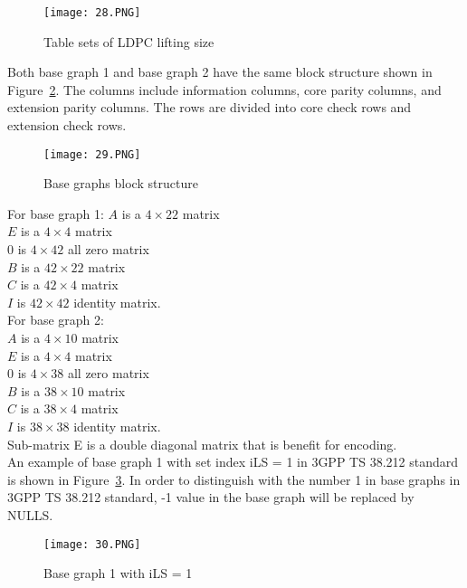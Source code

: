 \begin{figure}[h]
\centering
\label{fig:ldpc lifting sizes}
\texttt{[image: 28.PNG]}
\caption{Table sets of LDPC lifting size}
\end{figure}

Both base graph 1 and base graph 2 have the same block structure shown in Figure~\ref{fig:block structure}. The columns include information columns, core parity columns, and extension parity columns. The rows are divided into core check rows and extension check rows.

\begin{figure}[h]
\centering
\texttt{[image: 29.PNG]}
\caption{Base graphs block structure}
\label{fig:block structure}
\end{figure}

For base graph 1:
$A$ is a $4 \times 22$ matrix \\
$E$ is a $4 \times 4$ matrix \\
$0$ is $4 \times 42$ all zero matrix \\
$B$ is a $42 \times 22$ matrix \\
$C$ is a $42 \times 4$ matrix \\
$I$ is $42 \times 42$ identity matrix. \\

For base graph 2: \\
$A$ is a $4 \times 10$ matrix \\
$E$ is a $4 \times 4$ matrix \\
$0$ is $4 \times 38$ all zero matrix\\
$B$ is a $38 \times 10$ matrix \\
$C$ is a $38 \times 4$ matrix \\
$I$ is $38 \times 38$ identity matrix. \\

Sub-matrix E is a double diagonal matrix that is benefit for encoding. \\
An example of base graph 1 with set index iLS = 1 in 3GPP TS 38.212 standard is shown in Figure~\ref{fig:standard base graph 1}. In order to distinguish with the number 1 in base graphs in 3GPP TS 38.212 standard, -1 value in the base graph will be replaced by NULLS.

\begin{figure}[h]
\centering
\texttt{[image: 30.PNG]}
\caption{Base graph 1 with iLS = 1}
\label{fig:standard base graph 1}
\end{figure}

